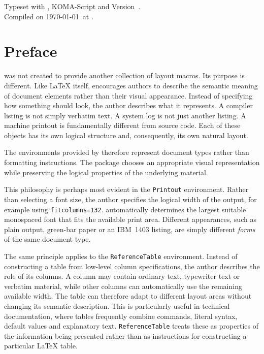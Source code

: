 \documentclass[
11pt,
a4paper,
oneside
]{scrbook}
\begin{document}
\bigskip

\noindent
Typeset with \usedtexengine, KOMA-Script and
\mdlayout{} Version~\mdlayoutVersion.\\
Compiled on \today\ at \currenttime.


\chapter*{Preface}


\mdlayout{} was not created to provide another collection of layout
macros. Its purpose is different. 
Like \LaTeX{} itself, \mdlayout{} encourages authors to describe the
semantic meaning of document elements rather than their visual
appearance. 
Instead of specifying how something should look, the author
describes what it represents.
A compiler listing is not simply verbatim text. A system log is not just
another listing. A machine printout is fundamentally different from
source code. Each of these objects has its own logical structure and,
consequently, its own natural layout.

The environments provided by \mdlayout{} therefore represent document
types rather than formatting instructions. The package chooses an
appropriate visual representation while preserving the logical
properties of the underlying material.

This philosophy is perhaps most evident in the \texttt{Printout}
environment. Rather than selecting a font size, the author specifies the
logical width of the output, for example using
\texttt{fitcolumns=132}. \mdlayout{} automatically determines the
largest suitable monospaced font that fits the available print area.
Different appearances, such as plain output, green-bar paper or an
IBM~1403 listing, are simply different \emph{forms} of the same document
type.

The same principle applies to the \texttt{ReferenceTable} environment.
Instead of constructing a table from low-level column specifications,
the author describes the role of its columns. A column may contain
ordinary text, typewriter text or verbatim material, while other columns
can automatically use the remaining available width. The table can
therefore adapt to different layout areas without changing its semantic
description.
This is particularly useful in technical documentation, where tables
frequently combine commands, literal syntax, default values and
explanatory text. \texttt{ReferenceTable} treats these as properties of
the information being presented rather than as instructions for
constructing a particular \LaTeX{} table.
\end{document}
